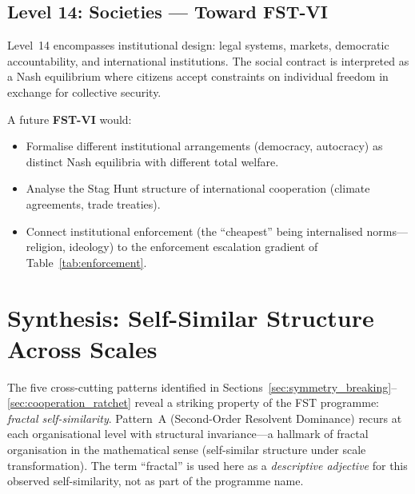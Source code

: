 \documentclass[12pt,a4paper]{article}
\theoremstyle{remark}
\begin{document}
\subsection{Level 14: Societies --- Toward FST-VI}

Level~14 encompasses institutional design: legal systems, markets, democratic accountability, and international institutions. The social contract is interpreted as a Nash equilibrium where citizens accept constraints on individual freedom in exchange for collective security.

A future \textbf{FST-VI} would:
\begin{itemize}[leftmargin=2em]
  \item Formalise different institutional arrangements (democracy, autocracy) as distinct Nash equilibria with different total welfare.
  \item Analyse the Stag Hunt structure of international cooperation (climate agreements, trade treaties).
  \item Connect institutional enforcement (the ``cheapest'' being internalised norms---religion, ideology) to the enforcement escalation gradient of Table~\ref{tab:enforcement}.
\end{itemize}


\section{Synthesis: Self-Similar Structure Across Scales}
\label{sec:synthesis}

The five cross-cutting patterns identified in Sections~\ref{sec:symmetry_breaking}--\ref{sec:cooperation_ratchet} reveal a striking property of the FST programme: \emph{fractal self-similarity}. Pattern~A (Second-Order Resolvent Dominance) recurs at each organisational level with structural invariance---a hallmark of fractal organisation in the mathematical sense (self-similar structure under scale transformation). The term ``fractal'' is used here as a \emph{descriptive adjective} for this observed self-similarity, not as part of the programme name.
\end{document}
